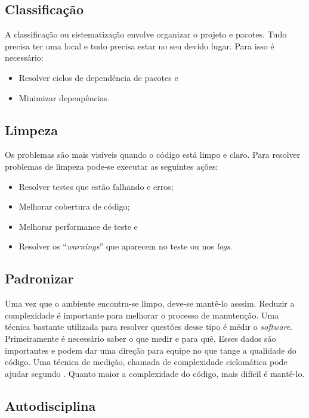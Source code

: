 \subsection{Classificação}

A classificação ou sistematização envolve organizar o projeto e pacotes. Tudo precisa ter uma local e tudo precisa estar no seu devido lugar. Para isso é necessário:

\begin{itemize}
	\item Resolver ciclos de dependência de pacotes e
	\item Minimizar depenpências.
\end{itemize}

\subsection{Limpeza}

Os problemas são mais visíveis quando o código está limpo e claro. Para resolver problemas de limpeza pode-se executar as seguintes ações:

\begin{itemize}
	\item Resolver testes que estão falhando e erros;
	\item Melhorar cobertura de código;
	\item Melhorar performance de teste e
	\item Resolver os ``\textit{warnings}'' que aparecem no teste ou nos \textit{logs}.
\end{itemize}

\subsection{Padronizar}

Uma vez que o ambiente encontra-se limpo, deve-se mantê-lo asssim. Reduzir a complexidade é importante para melhorar o processo de manutenção. Uma técnica bastante utilizada para resolver questões desse tipo é médir o \textit{software}. Primeiramente é necessário saber o que medir e para quê. Esses dados são importantes e podem dar uma direção para equipe no que tange a qualidade do código. Uma técnica de medição, chamada de complexidade ciclomática pode ajudar segundo . Quanto maior a complexidade do código, mais difícil é mantê-lo.

\subsection{Autodisciplina}

